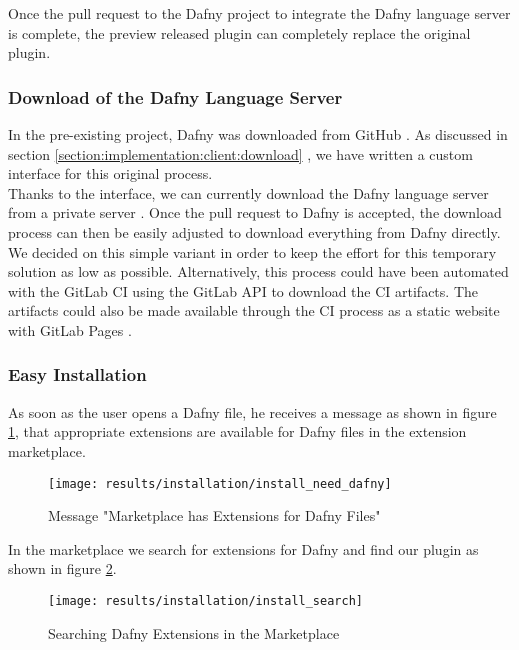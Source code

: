 Once the pull request to the Dafny project to integrate the Dafny language server is complete,
the preview released plugin can completely replace the original plugin.

\subsubsection{Download of the Dafny Language Server}
In the pre-existing project, Dafny was downloaded from GitHub \cite{dafny_lang_builds}.
As discussed in section \ref{section:implementation:client:download} \textendash{} ,
we have written a custom interface for this original process.\\

Thanks to the interface, we can currently download the Dafny language server from a private server \cite{client-serverStringResources}.
Once the pull request to Dafny is accepted, the download process can then be easily adjusted to download everything from Dafny directly.\\

We decided on this simple variant in order to keep the effort for this temporary solution as low as possible.
Alternatively, this process could have been automated with the GitLab CI using the GitLab API \cite{gitlab-api} to download the CI artifacts.
The artifacts could also be made available through the CI process as a static website with GitLab Pages \cite{gitlab-pages}.

\subsubsection{Easy Installation}
As soon as the user opens a Dafny file, he receives a message as shown in figure \ref{fig:install_need_dafny},
that appropriate extensions are available for Dafny files in the extension marketplace.

\begin{figure}[H]
    \centering
    \texttt{[image: results/installation/install\_need\_dafny]}
    \caption{Message "Marketplace has Extensions for Dafny Files"}
    \label{fig:install_need_dafny}
\end{figure}

In the marketplace we search for extensions for Dafny and find our plugin as shown in figure \ref{fig:install_search}.

\begin{figure}[H]
    \centering
    \texttt{[image: results/installation/install\_search]}
    \caption{Searching Dafny Extensions in the Marketplace}
    \label{fig:install_search}
\end{figure}

